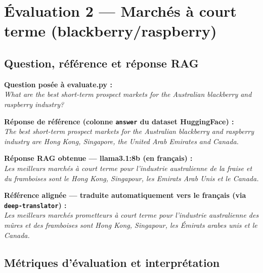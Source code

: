 \documentclass[12pt,a4paper]{report}
\begin{document}
\section{Évaluation 2 — Marchés à court terme (blackberry/raspberry)}

\subsection{Question, référence et réponse RAG}

\vspace{6pt}
\begin{evalbox}
\textbf{Question posée à evaluate.py :}\\[4pt]
\textit{What are the best short-term prospect markets for the Australian blackberry
and raspberry industry?}

\vspace{10pt}
\textbf{Réponse de référence (colonne \texttt{answer} du dataset HuggingFace) :}\\[4pt]
\textit{The best short-term prospect markets for the Australian blackberry and
raspberry industry are Hong Kong, Singapore, the United Arab Emirates and Canada.}

\vspace{10pt}
\textbf{Réponse RAG obtenue — llama3.1:8b (en français) :}\\[4pt]
\textit{Les meilleurs marchés à court terme pour l'industrie australienne de la
fraise et du framboises sont le Hong Kong, Singapour, les Emirats Arab Unis et
le Canada.}

\vspace{10pt}
\textbf{Référence alignée — traduite automatiquement vers le français
(via \texttt{deep-translator}) :}\\[4pt]
\textit{Les meilleurs marchés prometteurs à court terme pour l'industrie australienne
des mûres et des framboises sont Hong Kong, Singapour, les Émirats arabes unis
et le Canada.}
\end{evalbox}

\subsection{Métriques d'évaluation et interprétation}
\end{document}
